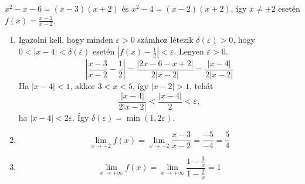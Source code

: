 \documentclass[11pt]{scrartcl}
\begin{document}
$x^2 - x - 6 = (x - 3)(x + 2)$ és $x^2 - 4 = (x - 2)(x + 2)$, így
$x \ne \pm 2$ esetén \(f(x) = \frac{x - 3}{x - 2}\).
\begin{enumerate}
	\item Igazolni kell, hogy minden $\varepsilon > 0$ számhoz létezik
	      $\delta(\varepsilon) > 0$, hogy $0 < |x - 4| < \delta(\varepsilon)$
	      esetén $\left| f(x) - \frac{1}{2} \right| < \varepsilon$. Legyen
	      $\varepsilon > 0$.
	      \[
		      \left| \frac{x - 3}{x - 2} - \frac{1}{2} \right|
		      = \frac{|2x - 6 - x + 2|}{2|x - 2|}
		      = \frac{|x - 4|}{2|x - 2|}
	      \]
	      Ha $|x - 4| < 1$, akkor $3 < x < 5$, így $|x - 2| > 1$, tehát
	      \[
		      \frac{|x - 4|}{2|x - 2|} < \frac{|x - 4|}{2} < \varepsilon,
	      \]
	      ha $|x - 4| < 2\varepsilon$. Így
	      $\delta(\varepsilon) = \min(1, 2\varepsilon)$.

	\item \[
		      \lim_{x \to -2} f(x)
		      = \lim_{x \to -2} \frac{x - 3}{x - 2}
		      = \frac{-5}{-4}
		      = \frac{5}{4}
	      \]

	\item \[
		      \lim_{x \to +\infty} f(x)
		      = \lim_{x \to +\infty} \frac{1 - \frac{3}{x}}{1 - \frac{2}{x}}
		      = 1
	      \]
\end{enumerate}
\end{document}
